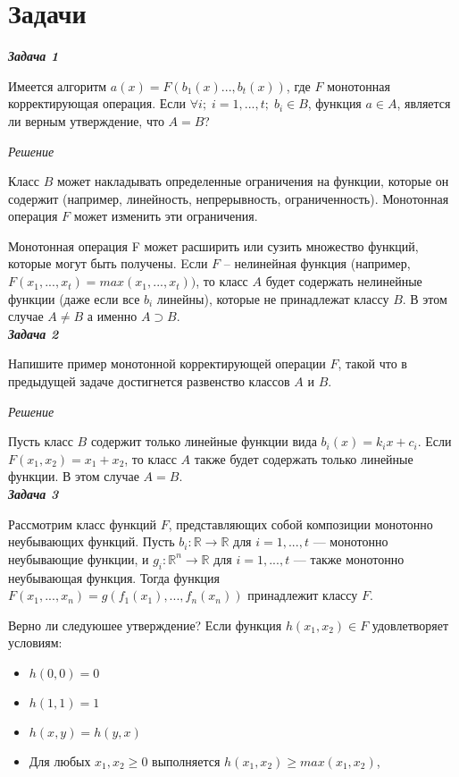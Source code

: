 \documentclass[a4paper,12pt]{article}
\begin{document}
\section{Задачи}
\textbf{\emph{Задача 1}}

Имеется алгоритм $a(x)=F(b_1(x)...,b_t(x))$, где $F$ монотонная корректирующая операция. 
Если $\forall i; \; i = 1,...,t; \; b_i\in B$, функция $a \in A$, является ли верным утверждение, что $A=B$?

\textit{Решение}

Класс $B$ может накладывать определенные ограничения на функции, которые он содержит (например, линейность, непрерывность, ограниченность). Монотонная операция $F$ может изменить эти ограничения.

 Монотонная операция F может расширить или сузить множество функций, которые могут быть получены. Eсли $F$ – нелинейная функция (например, $F(x_1, ..., x_t) = max(x_1, ..., x_t))$, то класс $A$ будет содержать нелинейные функции (даже если все $b_i$ линейны), которые не принадлежат классу $B$. В этом случае $A \neq B$ а именно $A \supset B $.\\

\textbf{\emph{Задача 2}}

Напишите пример монотонной корректирующей операции $F$, такой что в предыдущей задаче достигнется развенство классов $A$ и $B$.


\textit{Решение}

Пусть класс $B$ содержит только линейные функции вида $b_i(x) = k_i x + c_i$. Если $F(x_1, x_2) = x_1 + x_2$, то класс $A$ также будет содержать только линейные функции. В этом случае $A = B$.\\

\textbf{\emph{Задача 3}}

Рассмотрим класс функций $F$, представляющих собой композиции монотонно неубывающих функций. Пусть $b_i: \mathbb{R} \rightarrow \mathbb{R}$ для $i = 1, ..., t$ — монотонно неубывающие функции, и $g_i: \mathbb{R}^n \rightarrow \mathbb{R}$ для $i = 1, ..., t$ — также монотонно неубывающая функция. Тогда функция $F(x_1, ..., x_n) = g(f_1(x_1), ..., f_n(x_n))$ принадлежит классу $F$.

Верно ли следуюшее утверждение? Если функция $h(x_1, x_2) \in F$ удовлетворяет условиям:

\begin{itemize}
\item $h(0, 0) = 0$
\item $h(1, 1) = 1$
\item $h(x, y) = h(y, x)$
\item Для любых $x_1, x_2 \geq 0$ выполняется $h(x_1, x_2) \geq max(x_1, x_2)$,

\end{itemize}
\end{document}
